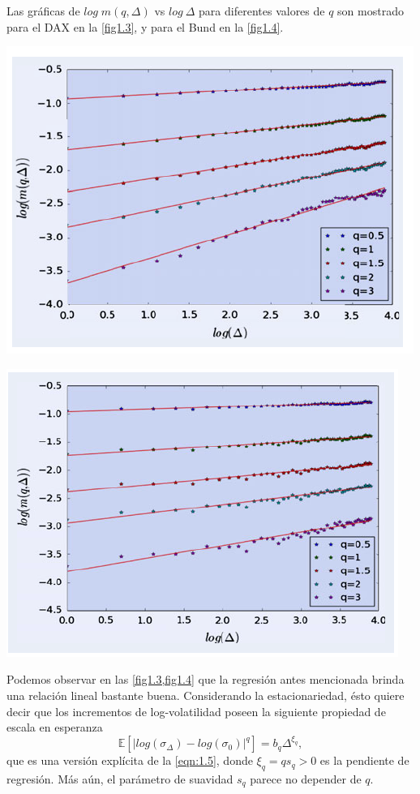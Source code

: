 \documentclass[letterpaper,12pt,oneside]{book}
\theoremstyle{plain}
\numberwithin{theorem}{section}
\begin{document}
Las gráficas de $log\; m (q,\Delta)$ vs $log\:\Delta$ para diferentes valores de $q$ son mostrado para el DAX en la \cref{fig1.3}, y para el Bund en la \cref{fig1.4}.
\begin{center}
	\includegraphics[scale=0.7]{fig3.png}
	\label{fig1.3}
\end{center}
\begin{center}
	\includegraphics[scale=0.7]{fig4.png}
	\label{fig1.4}
\end{center}
Podemos observar en las \cref{fig1.3,fig1.4} que la regresión antes mencionada brinda una relación lineal bastante buena. Considerando la estacionariedad, ésto quiere decir que los incrementos de log-volatilidad poseen la siguiente propiedad de escala en esperanza
$$\mathbb E\left[\left|log(\sigma_\Delta)-log(\sigma_0)\right|^q\right]=b_q\Delta^{\xi_q},$$
que es una versión explícita de la \cref{eqn:1.5}, donde $\xi_q=qs_q>0$ es la pendiente de regresión. Más aún, el parámetro de suavidad $s_q$ parece no depender de $q$.
\end{document}
